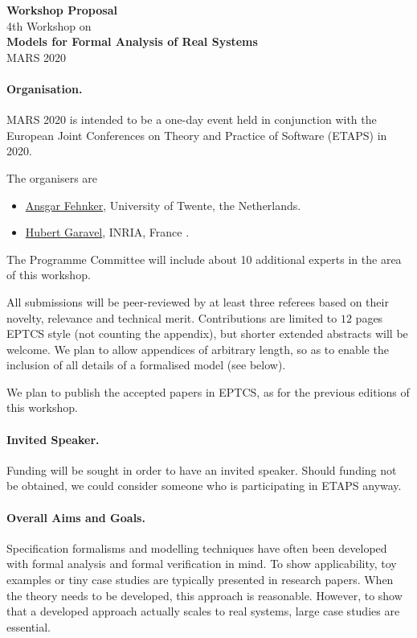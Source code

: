 \documentclass{article}
\begin{document}
\begin{center}
{\Large\bf Workshop Proposal}\\[5mm]
{\large 4th Workshop on }\\[2mm]
{\LARGE\bf Models for Formal Analysis of Real Systems}\\[2mm]
{\LARGE MARS 2020}
\end{center}

\paragraph*{Organisation.} MARS 2020 is intended to be a one-day event
held in conjunction with the European Joint Conferences on Theory and
Practice of Software (ETAPS) in 2020.

The organisers are
\begin{itemize}
\item[] \href{https://wwwhome.ewi.utwente.nl/~fehnkera/}{Ansgar Fehnker},
  University of Twente, the Netherlands.
\item[] \href{http://convecs.inria.fr/people/Hubert.Garavel/}{Hubert Garavel},
  INRIA, France .
\end{itemize}
The Programme Committee will include about 10 additional experts in
the area of this workshop.

All submissions will be peer-reviewed by at least three referees based
on their novelty, relevance and technical merit.  Contributions are
limited to $12$ pages EPTCS style (not counting the appendix), but
shorter extended abstracts will be welcome.  We plan to allow
appendices of arbitrary length, so as to enable the inclusion of all
details of a formalised model (see below).

We plan to publish the accepted papers in EPTCS, as for the previous editions of this workshop.

\paragraph*{Invited Speaker.} Funding will be sought in order to have an invited speaker.
Should funding not be obtained, we could consider someone who is participating
in ETAPS anyway.

\paragraph*{Overall Aims and Goals.}

Specification formalisms and modelling techniques have often been
developed with formal analysis and formal verification in mind. To
show applicability, toy examples or tiny case studies are typically
presented in research papers. When the theory needs to be developed, this approach is reasonable.  However, to show that a developed
approach actually scales to real systems, large case studies are
essential.
\end{document}
